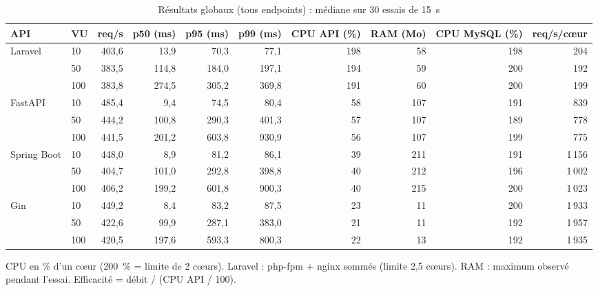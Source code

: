 \begin{table}[t]
\centering
\small
\caption{Résultats globaux (tous endpoints) : médiane sur 30 essais de 15~s}
\label{tab:global}
\begin{tabular}{llrrrrrrrr}
\toprule
API & VU & req/s & p50 (ms) & p95 (ms) & p99 (ms) & CPU API (\%) & RAM (Mo) & CPU MySQL (\%) & req/s/cœur \\
\midrule
\multirow{3}{*}{Laravel} & 10 & 403,6 & 13,9 & 70,3 & 77,1 & 198 & 58 & 198 & 204 \\
 & 50 & 383,5 & 114,8 & 184,0 & 197,1 & 194 & 59 & 200 & 192 \\
 & 100 & 383,8 & 274,5 & 305,2 & 369,8 & 191 & 60 & 200 & 199 \\
\midrule
\multirow{3}{*}{FastAPI} & 10 & 485,4 & 9,4 & 74,5 & 80,4 & 58 & 107 & 191 & 839 \\
 & 50 & 444,2 & 100,8 & 290,3 & 401,3 & 57 & 107 & 189 & 778 \\
 & 100 & 441,5 & 201,2 & 603,8 & 930,9 & 56 & 107 & 199 & 775 \\
\midrule
\multirow{3}{*}{Spring Boot} & 10 & 448,0 & 8,9 & 81,2 & 86,1 & 39 & 211 & 191 & 1\,156 \\
 & 50 & 404,7 & 101,0 & 292,8 & 398,8 & 40 & 212 & 196 & 1\,002 \\
 & 100 & 406,2 & 199,2 & 601,8 & 900,3 & 40 & 215 & 200 & 1\,023 \\
\midrule
\multirow{3}{*}{Gin} & 10 & 449,2 & 8,4 & 83,2 & 87,5 & 23 & 11 & 200 & 1\,933 \\
 & 50 & 422,6 & 99,9 & 287,1 & 383,0 & 21 & 11 & 192 & 1\,957 \\
 & 100 & 420,5 & 197,6 & 593,3 & 800,3 & 22 & 13 & 192 & 1\,935 \\
\bottomrule
\end{tabular}
\par\smallskip\footnotesize CPU en \% d'un cœur (200~\% = limite de 2 cœurs). Laravel : php-fpm + nginx sommés (limite 2,5 cœurs). RAM : maximum observé pendant l'essai. Efficacité = débit / (CPU API / 100).
\end{table}

